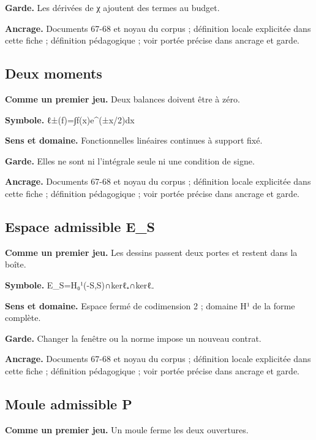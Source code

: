 \documentclass[
  9pt,
  a4paper,
]{article}
\begin{document}
\textbf{Garde.} Les dérivées de χ ajoutent des termes au budget.

\textbf{Ancrage.} Documents 67-68 et noyau du corpus ; définition locale
explicitée dans cette fiche ; définition pédagogique ; voir portée
précise dans ancrage et garde.

\hypertarget{deux-moments}{%
\subsection{Deux moments}\label{deux-moments}}

\textbf{Comme un premier jeu.} Deux balances doivent être à zéro.

\textbf{Symbole.} ℓ±(f)=∫f(x)e\^{}(±x/2)dx

\textbf{Sens et domaine.} Fonctionnelles linéaires continues à support
fixé.

\textbf{Garde.} Elles ne sont ni l'intégrale seule ni une condition de
signe.

\textbf{Ancrage.} Documents 67-68 et noyau du corpus ; définition locale
explicitée dans cette fiche ; définition pédagogique ; voir portée
précise dans ancrage et garde.

\hypertarget{espace-admissible-e_s}{%
\subsection{Espace admissible E\_S}\label{espace-admissible-e_s}}

\textbf{Comme un premier jeu.} Les dessins passent deux portes et
restent dans la boîte.

\textbf{Symbole.} E\_S=H₀¹(-S,S)∩kerℓ₊∩kerℓ₋

\textbf{Sens et domaine.} Espace fermé de codimension 2 ; domaine H¹ de
la forme complète.

\textbf{Garde.} Changer la fenêtre ou la norme impose un nouveau
contrat.

\textbf{Ancrage.} Documents 67-68 et noyau du corpus ; définition locale
explicitée dans cette fiche ; définition pédagogique ; voir portée
précise dans ancrage et garde.

\hypertarget{moule-admissible-p}{%
\subsection{Moule admissible P}\label{moule-admissible-p}}

\textbf{Comme un premier jeu.} Un moule ferme les deux ouvertures.
\end{document}
